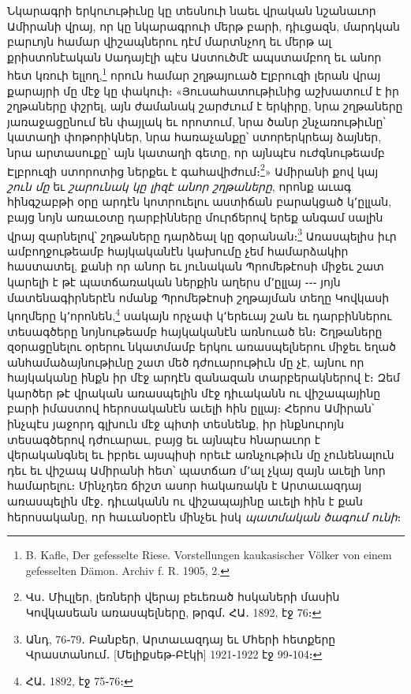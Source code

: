 \documentclass{article}
\begin{document}
{Նկարագրի երկուութիւնը կը տեսնուի նաեւ վրական նշանաւոր Ամիրանի վրայ, որ կը նկարագրուի մերթ բարի, դիւցազն, մարդկան բարւոյն համար վիշապներու դէմ մարտնչող եւ մերթ ալ քրիստոնէական Սադայէլի պէս Աստուծմէ ապստամբող եւ անոր հետ կռուի ելլող,\footnote{B. Kafle, Der gefesselte Riese. Vorstellungen kaukasischer Völker von einem gefesselten Dämon. Archiv f. R. 1905, 2.} որուն համար շղթայուած Էլբրուզի լերան վրայ քարայրի մը մէջ կը փակուի։ «Յուսահատութիւնից աշխատում է իր շղթաները փշրել, այն ժամանակ շարժւում է երկիրը, նրա շղթաները յառաջացընում են փայլակ եւ որոտում, նրա ծանր շնչառութիւնը՝ կատաղի փոթորիկներ, նրա հառաչանքը՝ ստորերկրեայ ձայներ, նրա արտասուքը՝ այն կատաղի գետը, որ այնպէս ուժգնութեամբ Էլբրուզի ստորոտից ներքեւ է գահավիժում։\footnote{Վս․ Միւլլեր, լեռների վերայ բեւեռած հսկաների մասին Կովկասեան առասպելները, թրգմ․ ՀԱ․ 1892, էջ 76։}» Ամիրանի քով կայ \emph{շուն մը} եւ \emph{շարունակ կը լիզէ անոր շղթաները}, որոնք աւագ հինգշաբթի օրը արդէն կոտրուելու աստիճան բարակցած կ՚ըլլան, բայց նոյն առաւօտը դարբինները մուրճերով երեք անգամ սալին վրայ զարնելով՝ շղթաները դարձեալ կը զօրանան։\footnote{Անդ, 76֊79․ Բանբեր, Արտաւազդայ եւ Մհերի հետքերը Վրաստանում․ [Մելիքսեթ֊Բէկի] 1921֊1922 էջ 99֊104։} Առասպելիս իւր ամբողջութեամբ հայկականէն կախումը չեմ համարձակիր հաստատել, քանի որ անոր եւ յունական Պրոմեթէոսի միջեւ շատ կարելի է թէ պատճառական ներքին աղերս մ՚ըլլայ ֊֊֊ յոյն մատենագիրներէն ոմանք Պրոմեթէոսի շղթայման տեղը Կովկասի կողմերը կ՚որոնեն,\footnote{ՀԱ․ 1892, էջ 75֊76։} սակայն որչափ կ՚երեւայ շան եւ դարբիններու տեսագծերը նոյնութեամբ հայկականէն առնուած են։ Շղթաները զօրացընելու օրերու նկատմամբ երկու առասպելներու միջեւ եղած անհամաձայնութիւնը շատ մեծ դժուարութիւն մը չէ, այնու որ հայկականը ինքն իր մէջ արդէն զանազան տարբերակներով է։ Զեմ կարծեր թէ վրական առասպելին մէջ դիւականն ու վիշապայինը բարի իմաստով հերոսականէն աւելի հին ըլլայ։ Հերոս Ամիրան՝ ինչպէս յաջորդ գլխուն մէջ պիտի տեսնենք, իր ինքնուրոյն տեսագծերով դժուարաւ, բայց եւ այնպէս հնարաւոր է վերականգնել եւ իբրեւ այսպիսի որեւէ առնչութիւն մը չունենալուն դեւ եւ վիշապ Ամիրանի հետ՝ պատճառ մ՚ալ չկայ զայն աւելի նոր համարելու։ Մինչդեռ ճիշտ ասոր հակառակն է Արտաւազդայ առասպելին մէջ․ դիւականն ու վիշապայինը աւելի հին է քան հերոսականը, որ հաւանօրէն մինչեւ իսկ \emph{պատմական ծագում ունի}։

}
\end{document}
